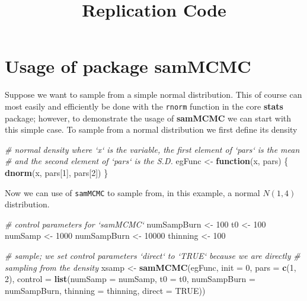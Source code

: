 \documentclass[]{article}
\title{Replication Code}
\author{}
\date{}
\newenvironment{Shaded}{\begin{snugshade}}{\end{snugshade}}
\newcommand{\CommentTok}[1]{\textcolor[rgb]{0.56,0.35,0.01}{\textit{#1}}}
\newcommand{\ControlFlowTok}[1]{\textcolor[rgb]{0.13,0.29,0.53}{\textbf{#1}}}
\newcommand{\DataTypeTok}[1]{\textcolor[rgb]{0.13,0.29,0.53}{#1}}
\newcommand{\DecValTok}[1]{\textcolor[rgb]{0.00,0.00,0.81}{#1}}
\newcommand{\KeywordTok}[1]{\textcolor[rgb]{0.13,0.29,0.53}{\textbf{#1}}}
\newcommand{\NormalTok}[1]{#1}
\newcommand{\OtherTok}[1]{\textcolor[rgb]{0.56,0.35,0.01}{#1}}
\newcommand{\StringTok}[1]{\textcolor[rgb]{0.31,0.60,0.02}{#1}}
\begin{document}
\maketitle

\hypertarget{usage-of-package-sammcmc}{%
\section{\texorpdfstring{Usage of package
\textbf{samMCMC}}{Usage of package samMCMC}}\label{usage-of-package-sammcmc}}

Suppose we want to sample from a simple normal distribution. This of
course can most easily and efficiently be done with the \texttt{rnorm}
function in the core \textbf{stats} package; however, to demonstrate the
usage of \textbf{samMCMC} we can start with this simple case. To sample
from a normal distribution we first define its density

\begin{Shaded}
\begin{Highlighting}[]
\CommentTok{# normal density where `x` is the variable, the first element of `pars` is the mean}
\CommentTok{# and the second element of `pars` is the S.D.}
\NormalTok{egFunc <-}\StringTok{ }\ControlFlowTok{function}\NormalTok{(x, pars) \{}
    \KeywordTok{dnorm}\NormalTok{(x, pars[}\DecValTok{1}\NormalTok{], pars[}\DecValTok{2}\NormalTok{])}
\NormalTok{\}}
\end{Highlighting}
\end{Shaded}

Now we can use of \texttt{samMCMC} to sample from, in this example, a
normal \(N(1, 4)\) distribution.

\begin{Shaded}
\begin{Highlighting}[]
\CommentTok{# control parameters for `samMCMC`}
\NormalTok{numSampBurn <-}\StringTok{ }\DecValTok{100}
\NormalTok{t0 <-}\StringTok{ }\DecValTok{100}
\NormalTok{numSamp <-}\StringTok{ }\DecValTok{1000}
\NormalTok{numSampBurn <-}\StringTok{ }\DecValTok{10000}
\NormalTok{thinning <-}\StringTok{ }\DecValTok{100}

\CommentTok{# sample; we set control parameters `direct` to `TRUE` because we are directly}
\CommentTok{# sampling from the density}
\NormalTok{xsamp <-}\StringTok{ }\KeywordTok{samMCMC}\NormalTok{(egFunc, }\DataTypeTok{init =} \DecValTok{0}\NormalTok{, }\DataTypeTok{pars =} \KeywordTok{c}\NormalTok{(}\DecValTok{1}\NormalTok{, }\DecValTok{2}\NormalTok{), }
               \DataTypeTok{control =} \KeywordTok{list}\NormalTok{(}\DataTypeTok{numSamp =}\NormalTok{ numSamp, }\DataTypeTok{t0 =}\NormalTok{ t0, }\DataTypeTok{numSampBurn =}\NormalTok{ numSampBurn,}
                              \DataTypeTok{thinning =}\NormalTok{ thinning, }\DataTypeTok{direct =} \OtherTok{TRUE}\NormalTok{))}
\end{Highlighting}
\end{Shaded}
\end{document}
